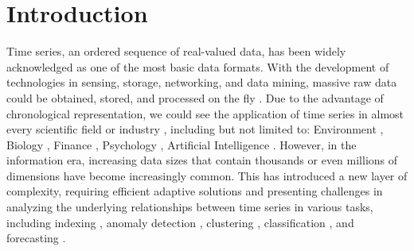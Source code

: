 \section{Introduction}
Time series, an ordered sequence of real-valued data, has been widely acknowledged as one of the most basic data formats. With the development of technologies in sensing, storage, networking, and data mining, massive raw data could be obtained, stored, and processed on the fly \cite{paparrizos2021vergedb, paparrizos2018fast}. Due to the advantage of chronological representation, we could see the application of time series in almost every scientific field or industry \cite{paparrizos2016detecting,paparrizos2016screening,goel2016social,mckeown2016predicting,jeung2010effective, liu2023amir,krishnan2019artificial,YANG2024acloserlook,li2023towards-noise}, including but not limited to: Environment \cite{iglesias2013analysis,kovsmelj1990cross,steinbach2003discovery}, Biology \cite{subhani2010multiple,wismuller2002cluster,zupko2023modeling}, Finance \cite{fu2001pattern,aghabozorgi2014stock,stetco2013fuzzy,guam2007cluster}, Psychology \cite{kurbalija2012time}, Artificial Intelligence \cite{tran2002fuzzy}. 
However, in the information era, increasing data sizes that contain thousands or even millions of dimensions have become increasingly common. 
This has introduced a new layer of complexity, requiring efficient adaptive solutions \cite{dziedzic2019band,jiang2020pids,jiang2021good,liu2021decomposed,liu2024adaedge} and presenting challenges in analyzing the underlying relationships between time series in various tasks, including indexing \cite{shieh2009isax, paparrizos2023querying, paparrizos2020debunking, paparrizos2022fast,paparrizos2023accelerating,d2024beyond}, anomaly detection \cite{sylligardos2023choose, boniol2021sand, boniol2021sandinaction, boniol2023new, boniol2022theseus, paparrizos2022tsb,paparrizos2022volume,liu2024elephant,boniol2024adecimo,boniol2024interactive,liu2024time}, clustering \cite{paparrizos2015k, paparrizos2017fast, paparrizos2023odyssey, bariya2021k}, classification \cite{shaw1992using, paparrizos2019grail}, and forecasting \cite{pavlidis2006financial}.



